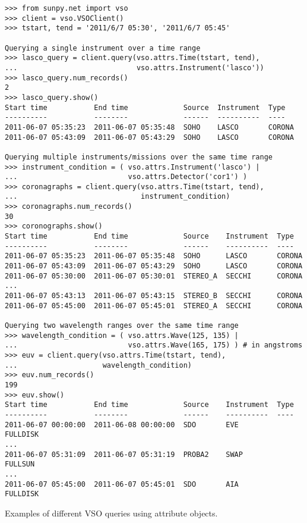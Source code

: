 \begin{listing}[h]
\begin{verbatim}
>>> from sunpy.net import vso
>>> client = vso.VSOClient()
>>> tstart, tend = '2011/6/7 05:30', '2011/6/7 05:45'

Querying a single instrument over a time range
>>> lasco_query = client.query(vso.attrs.Time(tstart, tend),
...                            vso.attrs.Instrument('lasco'))
>>> lasco_query.num_records()
2
>>> lasco_query.show() 
Start time           End time             Source  Instrument  Type
----------           --------             ------  ----------  ----
2011-06-07 05:35:23  2011-06-07 05:35:48  SOHO    LASCO       CORONA
2011-06-07 05:43:09  2011-06-07 05:43:29  SOHO    LASCO       CORONA

Querying multiple instruments/missions over the same time range
>>> instrument_condition = ( vso.attrs.Instrument('lasco') |
...                          vso.attrs.Detector('cor1') )
>>> coronagraphs = client.query(vso.attrs.Time(tstart, tend),
...                             instrument_condition)
>>> coronagraphs.num_records()
30
>>> coronographs.show() 
Start time           End time             Source    Instrument  Type
----------           --------             ------    ----------  ----
2011-06-07 05:35:23  2011-06-07 05:35:48  SOHO      LASCO       CORONA
2011-06-07 05:43:09  2011-06-07 05:43:29  SOHO      LASCO       CORONA
2011-06-07 05:30:00  2011-06-07 05:30:01  STEREO_A  SECCHI      CORONA
...
2011-06-07 05:43:13  2011-06-07 05:43:15  STEREO_B  SECCHI      CORONA
2011-06-07 05:45:00  2011-06-07 05:45:01  STEREO_A  SECCHI      CORONA

Querying two wavelength ranges over the same time range
>>> wavelength_condition = ( vso.attrs.Wave(125, 135) |
...                          vso.attrs.Wave(165, 175) ) # in angstroms
>>> euv = client.query(vso.attrs.Time(tstart, tend),
...                    wavelength_condition)
>>> euv.num_records()
199
>>> euv.show()
Start time           End time             Source    Instrument  Type
----------           --------             ------    ----------  ----
2011-06-07 00:00:00  2011-06-08 00:00:00  SDO       EVE         FULLDISK
...
2011-06-07 05:31:09  2011-06-07 05:31:19  PROBA2    SWAP        FULLSUN
...
2011-06-07 05:45:00  2011-06-07 05:45:01  SDO       AIA         FULLDISK
\end{verbatim}
\caption{Examples of different VSO queries using attribute objects.}
\label{code:vso_query}
\end{listing}

